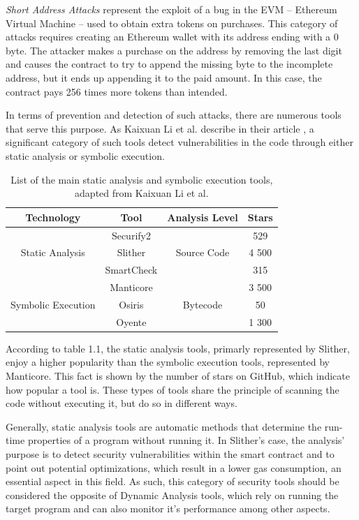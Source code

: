 \textit{Short Address Attacks} \cite{blockchainAttacks} represent the exploit of a bug in the EVM – Ethereum Virtual Machine – used to obtain extra tokens on purchases. This category of attacks requires creating an Ethereum wallet with its address ending with a 0 byte. The attacker makes a purchase on the address by removing the last digit and causes the contract to try to append the missing byte to the incomplete address, but it ends up appending it to the paid amount. In this case, the contract pays 256 times more tokens than intended. 

In terms of prevention and detection of such attacks, there are numerous tools that serve this purpose. As Kaixuan Li et al. describe in their article \cite{staticAnalysisToolsComparison}, a significant category of such tools detect vulnerabilities in the code through either static analysis or symbolic execution.


\begin{table}[h]
\centering
\begin{tabular}{cccc}
\hline
Technology         & Tool       & Analysis Level & Stars \\ \hline
                   & Securify2  &                & 529   \\
Static Analysis    & Slither    & Source Code    & 4 500 \\
                   & SmartCheck &                & 315   \\ \hline
                   & Manticore  &                & 3 500 \\
Symbolic Execution & Osiris     & Bytecode       & 50    \\
                   & Oyente     &                & 1 300 \\ \hline
\end{tabular}
\caption{List of the main static analysis and symbolic execution tools, adapted from Kaixuan Li et al. \cite{staticAnalysisToolsComparison}}
\end{table}

According to table 1.1, the static analysis tools, primarly represented by Slither, enjoy a higher popularity than the symbolic execution tools, represented by Manticore. This fact is shown by the number of stars on GitHub, which indicate how popular a tool is. These types of tools share the principle of scanning the code without executing it, but do so in different ways.

Generally, static analysis tools \cite{staticAnalysisDef} are automatic methods that determine the run-time properties of a program without running it. In Slither's \cite{slither} case, the analysis' purpose is to detect security vulnerabilities within the smart contract and to point out potential optimizations, which result in a lower gas consumption, an essential aspect in this field. As such, this category of security tools should be considered the opposite of Dynamic Analysis tools, which rely on running the target program and can also monitor it's performance among other aspects.

